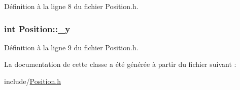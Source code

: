 Définition à la ligne 8 du fichier Position.h.

\hypertarget{a00014_a3c32d185bedca060aa1a3c136f10e3d6}{
\subsubsection[{\_\-y}]{\setlength{\rightskip}{0pt plus 5cm}int {\bf Position::\_\-y}}}
\label{a00014_a3c32d185bedca060aa1a3c136f10e3d6}


Définition à la ligne 9 du fichier Position.h.



La documentation de cette classe a été générée à partir du fichier suivant :\begin{DoxyCompactItemize}
\item 
include/\hyperlink{a00033}{Position.h}\end{DoxyCompactItemize}
